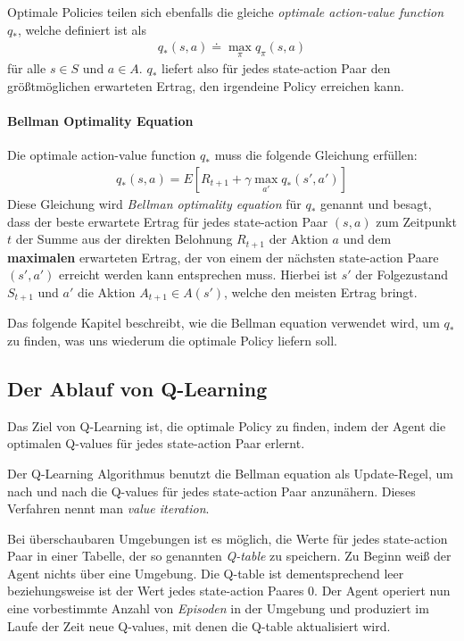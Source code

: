 Optimale Policies teilen sich ebenfalls die gleiche \textit{optimale action-value function} $ q_* $, welche definiert ist als
\begin{align}
    q_*(s, a) \doteq \max_\pi q_\pi(s, a)
\end{align}
für alle $ s \in S $ und $ a \in A $. $ q_* $ liefert also für jedes state-action Paar den größtmöglichen erwarteten Ertrag, den irgendeine Policy erreichen kann.

\paragraph{Bellman Optimality Equation}
Die optimale action-value function $ q_* $ muss die folgende Gleichung erfüllen:
\begin{align}
    q_*(s, a) = E \left[R_{t + 1} + \gamma \max_{a'} q_*(s', a') \right] \label{eq:bellman}
\end{align}
Diese Gleichung wird \textit{Bellman optimality equation} für $ q_* $ genannt und besagt, dass der beste erwartete Ertrag für jedes state-action Paar $ (s, a) $ zum Zeitpunkt $ t $ der Summe aus der direkten Belohnung $ R_{t + 1} $ der Aktion $ a $ und dem \textbf{maximalen} erwarteten Ertrag, der von einem der nächsten state-action Paare $ (s', a') $ erreicht werden kann entsprechen muss. Hierbei ist $ s' $ der Folgezustand $ S_{t + 1} $ und $ a' $ die Aktion $ A_{t + 1} \in A(s') $, welche den meisten Ertrag bringt.

Das folgende Kapitel beschreibt, wie die Bellman equation verwendet wird, um $ q_* $ zu finden, was uns wiederum die optimale Policy liefern soll. 

\subsection{Der Ablauf von Q-Learning} \label{sec:q_learning_process}
Das Ziel von Q-Learning ist, die optimale Policy zu finden, indem der Agent die optimalen Q-values für jedes state-action Paar erlernt.

Der Q-Learning Algorithmus benutzt die Bellman equation als Update-Regel, um nach und nach die Q-values für jedes state-action Paar anzunähern. Dieses Verfahren nennt man \textit{value iteration}.

Bei überschaubaren Umgebungen ist es möglich, die Werte für jedes state-action Paar in einer Tabelle, der so genannten \textit{Q-table} zu speichern. Zu Beginn weiß der Agent nichts über eine Umgebung. Die Q-table ist dementsprechend leer beziehungsweise ist der Wert jedes state-action Paares 0. Der Agent operiert nun eine vorbestimmte Anzahl von \textit{Episoden} in der Umgebung und produziert im Laufe der Zeit neue Q-values, mit denen die Q-table aktualisiert wird.

